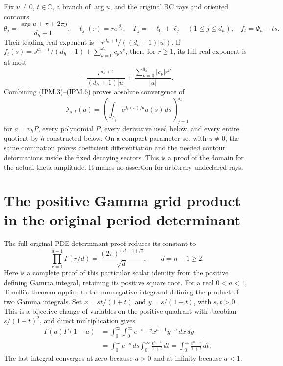 \documentclass[11pt,a4paper]{article}
\begin{document}
Fix \(u\ne0\), \(t\in\mathbb C\), a branch of \(\arg u\), and
the original BC rays and oriented contours
\[
 \theta_j=\frac{\arg u+\pi+2\pi j}{d_h+1},\quad
 \ell_j(r)=re^{i\theta_j},\quad
 \Gamma_j=-\ell_0+\ell_j\quad(1\le j\le d_h),\quad
 f_t=\Phi_h-ts.
 \tag{IPM.5}
\]
Their leading real exponent is
\(-r^{d_h+1}/((d_h+1)|u|)\). If
\(f_t(s)=s^{d_h+1}/(d_h+1)+\sum_{\nu=0}^{d_h}c_\nu s^\nu\),
then, for \(r\ge1\), its full real exponent is at most
\[
 -\frac{r^{d_h+1}}{(d_h+1)|u|}
       +\frac{\sum_{\nu=0}^{d_h}|c_\nu|r^\nu}{|u|}.
 \tag{IPM.6}
\]
Combining (IPM.3)--(IPM.6) proves absolute convergence of
\[
 \mathcal I_{u,t}(a)=
  \left(\int_{\Gamma_j}e^{f_t(s)/u}a(s)\,ds\right)_{j=1}^{d_h}
 \tag{IPM.7}
\]
for \(a=v_hP\), every polynomial \(P\), every derivative used below,
and every entire quotient by \(h\) constructed below. On a compact
parameter set with \(u\ne0\), the same domination proves coefficient
differentiation and the needed contour deformations inside the fixed
decaying sectors. This is a proof of the domain for the actual theta
amplitude. It makes no assertion for arbitrary undeclared rays.




\section{The positive Gamma grid product in the original period determinant}
\label{sec:PGCC}

The full original PDE determinant proof reduces its constant to
\[
 \prod_{r=1}^{d-1}\Gamma(r/d)
       =\frac{(2\pi)^{(d-1)/2}}{\sqrt d},\qquad d=n+1\geq2.
 \tag{PGCC1}
\]
Here is a complete proof of this particular scalar identity from the
positive defining Gamma integral, retaining its positive square root.
For a real $0<a<1$, Tonelli's theorem applies to the nonnegative
integrand defining the product of two Gamma integrals. Set
$x=st/(1+t)$ and $y=s/(1+t)$, with $s,t>0$. This is a bijective
change of variables on the positive quadrant with Jacobian
$s/(1+t)^2$, and direct multiplication gives
\[
 \begin{split}
 \Gamma(a)\Gamma(1-a)
 &=\int_0^\infty\int_0^\infty
        e^{-x-y}x^{a-1}y^{-a}\,dx\,dy\\
 &=\int_0^\infty e^{-s}\,ds
       \int_0^\infty\frac{t^{a-1}}{1+t}\,dt
  =\int_0^\infty\frac{t^{a-1}}{1+t}\,dt.
 \end{split}\tag{PGCC2}
\]
The last integral converges at zero because $a>0$ and at infinity
because $a<1$.
\end{document}
